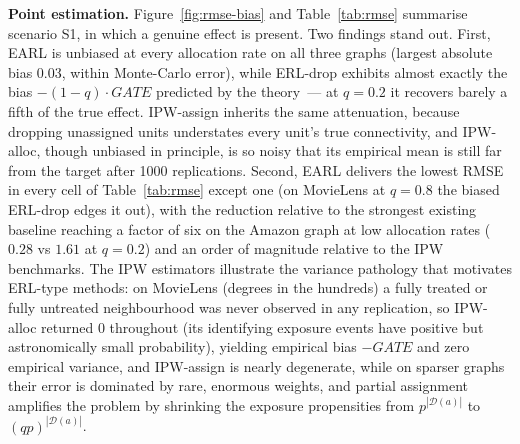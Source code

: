 \documentclass[sigconf]{acmart}
\begin{document}
\textbf{Point estimation.} Figure~\ref{fig:rmse-bias} and Table~\ref{tab:rmse} summarise scenario S1, in which a genuine effect is present. Two findings stand out. First, EARL is unbiased at every allocation rate on all three graphs (largest absolute bias $0.03$, within Monte-Carlo error), while ERL-drop exhibits almost exactly the bias $-(1-q)\cdot GATE$ predicted by the theory~--- at $q=0.2$ it recovers barely a fifth of the true effect. IPW-assign inherits the same attenuation, because dropping unassigned units understates every unit's true connectivity, and IPW-alloc, though unbiased in principle, is so noisy that its empirical mean is still far from the target after 1000 replications. Second, EARL delivers the lowest RMSE in every cell of Table~\ref{tab:rmse} except one (on MovieLens at $q=0.8$ the biased ERL-drop edges it out), with the reduction relative to the strongest existing baseline reaching a factor of six on the Amazon graph at low allocation rates ($0.28$ vs $1.61$ at $q=0.2$) and an order of magnitude relative to the IPW benchmarks. The IPW estimators illustrate the variance pathology that motivates ERL-type methods: on MovieLens (degrees in the hundreds) a fully treated or fully untreated neighbourhood was never observed in any replication, so IPW-alloc returned $0$ throughout (its identifying exposure events have positive but astronomically small probability), yielding empirical bias $-GATE$ and zero empirical variance, and IPW-assign is nearly degenerate, while on sparser graphs their error is dominated by rare, enormous weights, and partial assignment amplifies the problem by shrinking the exposure propensities from $p^{|\mathcal D(a)|}$ to $(qp)^{|\mathcal D(a)|}$.
\end{document}
